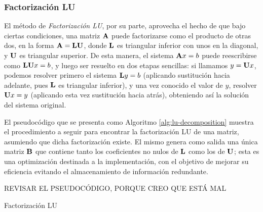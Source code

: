         \subsubsection{Factorización LU}

            El método de \emph{Factorización LU}, por su parte, aprovecha el hecho de que bajo ciertas condiciones, una matriz $\mathbf{A}$ puede factorizarse como el producto de otras dos, en la forma $\mathbf{A} = \mathbf{L}\mathbf{U}$, donde $\mathbf{L}$ es triangular inferior con unos en la diagonal, y $\mathbf{U}$ es triangular superior. De esta manera, el sistema $\mathbf{A}x=b$ puede reescribirse como $\mathbf{L}\mathbf{U}x=b$, y luego ser resuelto en dos etapas sencillas: si llamamos $y=\mathbf{U}x$, podemos resolver primero el sistema $\mathbf{L}y=b$ (aplicando sustitución hacia adelante, pues $\mathbf{L}$ es triangular inferior), y una vez conocido el valor de $y$, resolver $\mathbf{U}x=y$ (aplicando esta vez sustitución hacia atrás), obteniendo así la solución del sistema original.

            El pseudocódigo que se presenta como Algoritmo \ref{alg:lu-decomposition} muestra el procedimiento a seguir para encontrar la factorización LU de una matriz, asumiendo que dicha factorización existe. El mismo genera como salida una única matriz $\mathbf{B}$ que contiene tanto los coeficientes no nulos de $\mathbf{L}$ como los de $\mathbf{U}$; esta es una optimización destinada a la implementación, con el objetivo de mejorar su eficiencia evitando el almacenamiento de información redundante.

            {\color{red}  REVISAR EL PSEUDOCÓDIGO, PORQUE CREO QUE ESTÁ MAL}

            \vspace{.5em}
            \begin{algorithm}[H]
                \caption{Factorización LU} \label{alg:lu-decomposition}
            \end{algorithm}
            \vspace{.5em}

